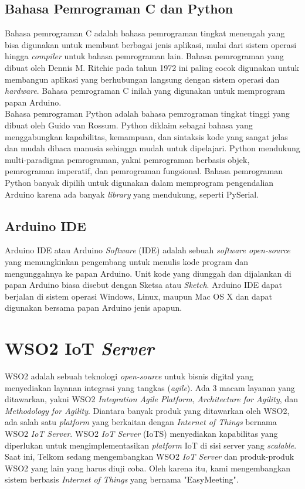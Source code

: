 \subsection{Bahasa Pemrograman C dan Python}
\tab Bahasa pemrograman C adalah bahasa pemrograman tingkat menengah yang bisa digunakan untuk membuat berbagai jenis aplikasi, mulai dari sistem operasi hingga \textit{compiler} untuk bahasa pemrograman lain. Bahasa pemrograman yang dibuat oleh Dennis M. Ritchie pada tahun 1972 ini paling cocok digunakan untuk membangun aplikasi yang berhubungan langsung dengan sistem operasi dan \textit{hardware}. Bahasa pemrograman C inilah yang digunakan untuk memprogram papan Arduino.\\
\tab Bahasa pemrograman Python adalah bahasa pemrograman tingkat tinggi yang dibuat oleh Guido van Rossum. Python diklaim sebagai bahasa yang menggabungkan kapabilitas, kemampuan, dan sintaksis kode yang sangat jelas dan mudah dibaca manusia sehingga mudah untuk dipelajari. Python mendukung multi-paradigma pemrograman, yakni pemrograman berbasis objek, pemrograman imperatif, dan pemrograman fungsional. Bahasa pemrograman Python banyak dipilih untuk digunakan dalam memprogram pengendalian Arduino karena ada banyak \textit{library} yang mendukung, seperti PySerial.

\subsection{Arduino IDE}
\tab Arduino IDE atau Arduino \textit{Software} (IDE) adalah sebuah \textit{software open-source} yang memungkinkan pengembang untuk menulis kode program dan mengunggahnya ke papan Arduino. Unit kode yang diunggah dan dijalankan di papan Arduino biasa disebut dengan Sketsa atau \textit{Sketch}. Arduino IDE dapat berjalan di sistem operasi Windows, Linux, maupun Mac OS X dan dapat digunakan bersama papan Arduino jenis apapun. 

\section{WSO2 IoT \textit{Server}}
\tab WSO2 adalah sebuah teknologi \textit{open-source} untuk bisnis digital yang menyediakan layanan integrasi yang tangkas (\textit{agile}). Ada 3 macam layanan yang ditawarkan, yakni WSO2 \textit{Integration Agile Platform}, \textit{Architecture for Agility}, dan \textit{Methodology for Agility}. Diantara banyak produk yang ditawarkan oleh WSO2, ada salah satu \textit{platform} yang berkaitan dengan \textit{Internet of Things} bernama WSO2 \textit{IoT Server}. WSO2 \textit{IoT Server} (IoTS) menyediakan kapabilitas yang diperlukan untuk mengimplementasikan \textit{platform} IoT di sisi server yang \textit{scalable}.\\
\tab Saat ini, Telkom sedang mengembangkan WSO2 \textit{IoT Server} dan produk-produk WSO2 yang lain yang harus diuji coba. Oleh karena itu, kami mengembangkan sistem berbasis \textit{Internet of Things} yang bernama "EasyMeeting".

\cleardoublepage